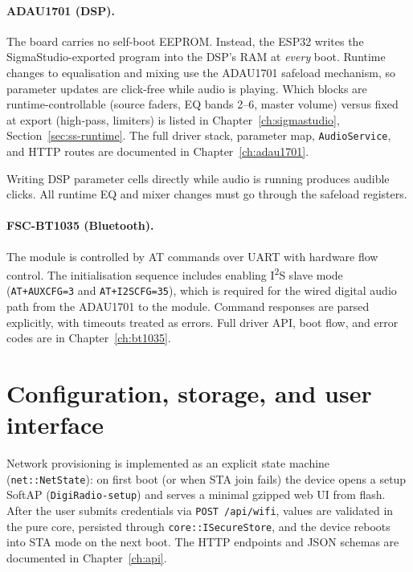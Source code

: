 \paragraph{ADAU1701 (DSP).}
The board carries no self-boot EEPROM. Instead, the ESP32 writes the
SigmaStudio-exported program into the DSP's RAM at \emph{every} boot.
Runtime changes to equalisation and mixing use the ADAU1701 safeload
mechanism, so parameter updates are click-free while audio is playing.
Which blocks are runtime-controllable (source faders, EQ bands 2--6,
master volume) versus fixed at export (high-pass, limiters) is listed in
Chapter~\ref{ch:sigmastudio}, Section~\ref{sec:ss-runtime}. The full driver
stack, parameter map, \texttt{AudioService}, and HTTP routes are documented
in Chapter~\ref{ch:adau1701}.

\begin{drcaution}[Safeload]
Writing DSP parameter cells directly while audio is running produces
audible clicks. All runtime EQ and mixer changes must go through the
safeload registers.
\end{drcaution}

\paragraph{FSC-BT1035 (Bluetooth).}
The module is controlled by AT commands over UART with hardware flow control.
The initialisation sequence includes enabling I\textsuperscript{2}S slave mode
(\texttt{AT+AUXCFG=3} and \texttt{AT+I2SCFG=35}), which is required for the
wired digital audio path from the ADAU1701 to the module.
Command responses are parsed explicitly, with timeouts treated as errors.
Full driver API, boot flow, and error codes are in Chapter~\ref{ch:bt1035}.

\section{Configuration, storage, and user interface}
\label{sec:fw-config}

Network provisioning is implemented as an explicit state machine
(\texttt{net::NetState}): on first boot (or when STA join fails) the
device opens a setup SoftAP (\texttt{DigiRadio-setup}) and serves a
minimal gzipped web UI from flash. After the user submits credentials via
\texttt{POST /api/wifi}, values are validated in the pure core, persisted
through \texttt{core::ISecureStore}, and the device reboots into STA mode
on the next boot. The HTTP endpoints and JSON schemas are documented in
Chapter~\ref{ch:api}.


